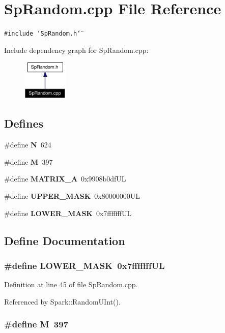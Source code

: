 \section{Sp\-Random.cpp File Reference}
\label{SpRandom_8cpp}
{\tt \#include \char`\"{}Sp\-Random.h\char`\"{}}\par


Include dependency graph for Sp\-Random.cpp:\begin{figure}[H]
\begin{center}
\leavevmode
\includegraphics[width=61pt]{SpRandom_8cpp__incl}
\end{center}
\end{figure}
\subsection*{Defines}
\begin{CompactItemize}
\item 
\#define {\bf N}\ 624
\item 
\#define {\bf M}\ 397
\item 
\#define {\bf MATRIX\_\-A}\ 0x9908b0df\-UL
\item 
\#define {\bf UPPER\_\-MASK}\ 0x80000000UL
\item 
\#define {\bf LOWER\_\-MASK}\ 0x7fffffff\-UL
\end{CompactItemize}


\subsection{Define Documentation}
\subsubsection{\setlength{\rightskip}{0pt plus 5cm}\#define LOWER\_\-MASK\ 0x7fffffff\-UL}\label{SpRandom_8cpp_a4}


Definition at line 45 of file Sp\-Random.cpp.

Referenced by Spark::Random\-UInt().
\subsubsection{\setlength{\rightskip}{0pt plus 5cm}\#define M\ 397}\label{SpRandom_8cpp_a1}


